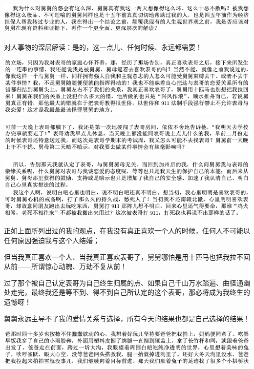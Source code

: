 \documentclass[9pt, b5paper]{article}
\begin{document}
\begin{center}
\includegraphics[width=.9\linewidth]{./pic/p1p137.png}
\end{center}

对人事物的深层解读：是的，这一点儿、任何时候、永远都需要！

\begin{center}
\includegraphics[width=.9\linewidth]{./pic/p1p137-1.png}
\end{center}

\begin{center}
\includegraphics[width=.9\linewidth]{./pic/p1p137-2.png}
\end{center}

\begin{center}
\includegraphics[width=.9\linewidth]{./pic/p1p137-3.png}
\end{center}

正如上面所列出过的我的观点，在我没有真正喜欢一个人的时候，任何人不可能以任何原因强迫我与这个人结婚；

但当我真正喜欢一个人、当我真正喜欢表哥了，舅舅哪怕是用十匹马也把我拉不回从前——所谓惊心动魄、万劫不复从前！

过了那个被自己认定表哥为自己终生归属的点、如果自己千山万水踏遍、曲径通幽处走完，最终我还是等不到、得不到自己所认定的这个表哥，那必将成为我终生的遗憾呀！

舅舅永远主导不了我的爱情关系与选择，所有今天的结果也都是自己选择的结果！

\begin{center}
\includegraphics[width=.9\linewidth]{./pic/p1p77.png}
\end{center}
\end{document}
